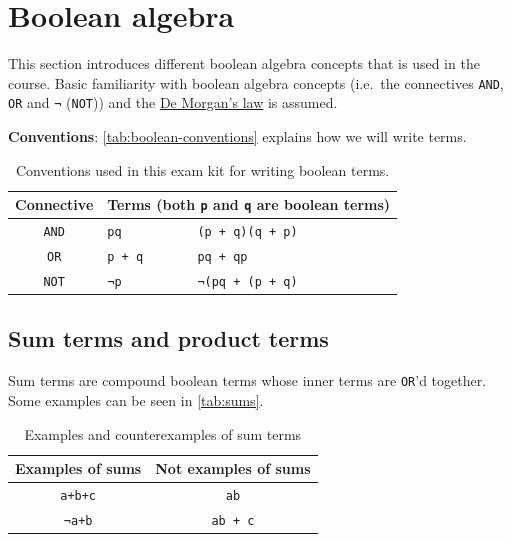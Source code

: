 \documentclass[a4paper,11pt]{report}
\newcommand{\enot}{¬}
\begin{document}
\section{Boolean algebra}

This section introduces different boolean algebra concepts that is
used in the course. Basic familiarity with boolean algebra concepts
(i.e.\ the connectives \texttt{AND}, \texttt{OR} and \texttt{\enot}
(\texttt{NOT})) and the
\href{https://en.wikipedia.org/wiki/De\_Morgan\%27s\_laws}{De Morgan's
  law} is assumed.

\textbf{Conventions}: \autoref{tab:boolean-conventions} explains how
we will write terms.

\begin{table}
  \centering
  \begin{tabular}{c | l l}
    \textbf{Connective} & \multicolumn{2}{c}{\textbf{Terms} (both \texttt{p} and \texttt{q} are boolean terms)} \\ \hline
    \texttt{AND} & \hspace{1em}\texttt{pq} & \hspace{1em}\texttt{(p + q)(q + p)}\\
    \texttt{OR}  & \hspace{1em}\texttt{p + q} & \hspace{1em}\texttt{pq + qp} \\
    \texttt{NOT} & \hspace{1em}\texttt{\enot{p}} & \hspace{1em}\texttt{\enot{(pq + (p + q)}}\\
  \end{tabular}
  \caption[Conventions --- boolean terms]{Conventions used in this exam kit for writing boolean terms.}
  \label{tab:boolean-conventions}
\end{table}

\subsection{Sum terms and product terms}

Sum terms are compound boolean terms whose inner terms are
\texttt{OR}'d together. Some examples can be seen in
\autoref{tab:sums}.

\begin{table}[H]
  \centering
  \begin{tabular}{c | c}
    \textbf{Examples of sums} & \textbf{Not examples of sums} \\ \hline
    \texttt{a+b+c}      & \texttt{ab} \\
    \texttt{\enot{a}+b} & \texttt{ab + c}
  \end{tabular}
  \caption[Examples of sum terms]{Examples and counterexamples of sum
    terms}%
\label{tab:sums}
\end{table}
\end{document}

